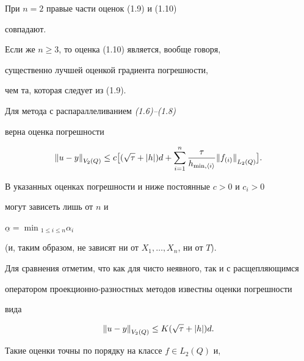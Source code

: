 \begin{note} При $n=2$ правые части оценок (1.9) и (1.10) 


совпадают.


Если  же $n\ge 3$, то оценка (1.10) является, вообще говоря,


существенно лучшей оценкой градиента погрешности,


чем та, которая следует из (1.9).


\end{note}





\begin{thm} Для метода с распараллеливанием {\em (1.6)--(1.8)}


верна оценка погрешности


\begin{equation}


{\ver u-y \ver}_{V_2(Q)}\le c\bigl[(\po)d+


\sum_{i=1}^n\frac{\tau}{h_{\min,\langle i\rangle}}


{\ver f_{(i)}\ver}_{L_2(Q)}\bigr].


\end{equation}


\end{thm}





В указанных оценках погрешности и ниже постоянные $c>0$ и $c_i>0$


могут зависеть лишь от $n$ и 


$\underline\alpha=\min{}_{1\le i\le n}\alpha_i$ 


(и, таким образом, не зависят ни от $X_1,\dotsc,X_n$, ни от $T$).





Для сравнения отметим, что как для чисто неявного, так и с расщепляющимся


оператором проекционно-разностных методов известны \cite{Z3} оценки погрешности


вида


\begin{equation}


{\ver u-y\ver}_{V_2(Q)}\le K(\po)d.


\end{equation}


%


Такие оценки точны по порядку на классе $f\in L_2(Q)$ и,


